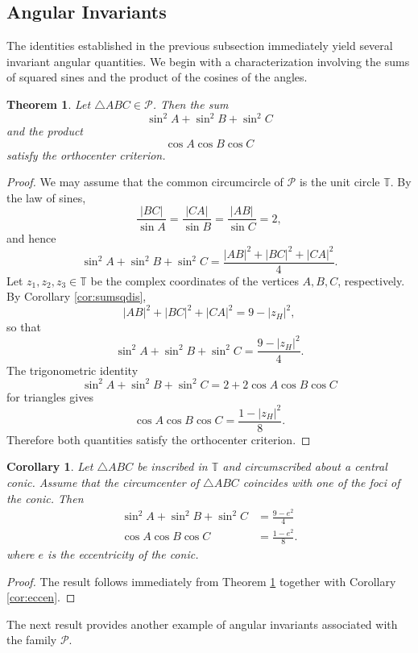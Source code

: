 \documentclass[11pt,reqno]{amsart}
\newtheorem{theorem}{Theorem}[section]
\newtheorem{corollary}{Corollary}[section]
\theoremstyle{definition}
\numberwithin{equation}{section}
\begin{document}
\subsection{Angular Invariants}\label{sec:anginv}

The identities established in the previous subsection immediately yield several invariant angular quantities. We begin with a characterization involving the sums of squared sines and the product of the cosines of the angles.

\begin{theorem}\label{thm:sina}
Let $\triangle ABC \in \mathcal P$. Then the sum
\[
\sin^2A+\sin^2B+\sin^2C
\]
and the product
\[
\cos A\cos B\cos C
\]
satisfy the orthocenter criterion.
\end{theorem}

\begin{proof}
We may assume that the common circumcircle of $\mathcal P$ is the unit circle $\mathbb T$. By the law of sines,
\[
\frac{|BC|}{\sin A}
=
\frac{|CA|}{\sin B}
=
\frac{|AB|}{\sin C}
=
2,
\]
and hence
\[
\sin^2A+\sin^2B+\sin^2C
=
\frac{|AB|^2+|BC|^2+|CA|^2}{4}.
\]
Let $z_1,z_2,z_3 \in \mathbb T$ be the complex coordinates of the vertices $A,B,C$, respectively. By Corollary \ref{cor:sumsqdis},
\[
|AB|^2+|BC|^2+|CA|^2
=
9-|z_H|^2,
\]
so that
\[
\sin^2A+\sin^2B+\sin^2C
=
\frac{9-|z_H|^2}{4}.
\]
The trigonometric identity 
\[
\sin^2A+\sin^2B+\sin^2C
=
2+2\cos A\cos B\cos C
\]
for triangles gives
\[
\cos A \cos B \cos C
=
\frac{1-|z_H|^2}{8}.
\]
Therefore both quantities satisfy the orthocenter criterion.
\end{proof}

\begin{corollary}
Let $\triangle ABC$ be inscribed in $\mathbb T$ and circumscribed about a central conic. Assume that the circumcenter of $\triangle ABC$ coincides with one of the foci of the conic. Then
\begin{align*}
    \sin^2A+\sin^2B+\sin^2C&=\frac{9-e^2}{4}\\
    \cos A \cos B \cos C&=\frac{1-e^2}{8}.
\end{align*}
where $e$ is the eccentricity of the conic.
\end{corollary}

\begin{proof}
The result follows immediately from Theorem \ref{thm:sina} together with Corollary \ref{cor:eccen}.
\end{proof}

The next result provides another example of angular invariants associated with the family $\mathcal P$.
\end{document}
